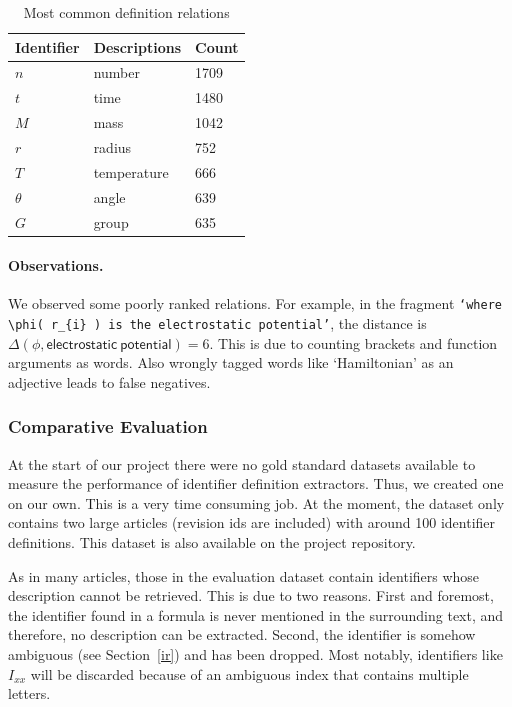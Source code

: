 \documentclass[runningheads]{llncs}
\begin{document}
\begin{table}[H]
	\begin{center}
	\begin{tabular}{| l | p{6.8cm} | l |}
		\hline
		Identifier & Descriptions & Count\\
		\hline
		$n$ & number & 1709 \\
		$t$ & time & 1480 \\
		$M$ & mass & 1042 \\
		$r$ & radius & 752 \\
		$T$ & temperature & 666 \\
		$\theta$ & angle & 639 \\
		$G$ & group & 635 \\
		\hline
	\end{tabular}
	\end{center}
\caption{\label{tcommon}Most common definition relations}
\end{table}


\paragraph{Observations.} We observed some poorly ranked relations. For
example, in the fragment \texttt{`where $\phi$( $r_{i}$ ) is the electrostatic
potential'}, the distance is %
$\Delta(\phi, \mathsf{electrostatic\:potential} ) = 6$. This is due
to counting brackets and function arguments as words. Also wrongly tagged
words like `Hamiltonian' as an adjective leads to false negatives.


\subsubsection{Comparative Evaluation}

At the start of our project there were no gold standard datasets available to
measure the performance of identifier definition extractors. Thus, we created
one on our own. This is a very time consuming job. At the moment, the dataset
only contains two large articles (revision ids are included) with around 100
identifier definitions. This dataset is also available on the project
repository.


As in many articles, those in the evaluation dataset contain identifiers
whose description cannot be retrieved. This is due to two reasons. First and
foremost, the identifier found in a formula is never mentioned in the
surrounding text, and therefore, no description can be extracted. Second, the
identifier is somehow ambiguous (see Section~\ref{ir}) and has been dropped. Most
notably, identifiers like $I_{xx}$ will be discarded because of an ambiguous
index that contains multiple letters.
\end{document}
